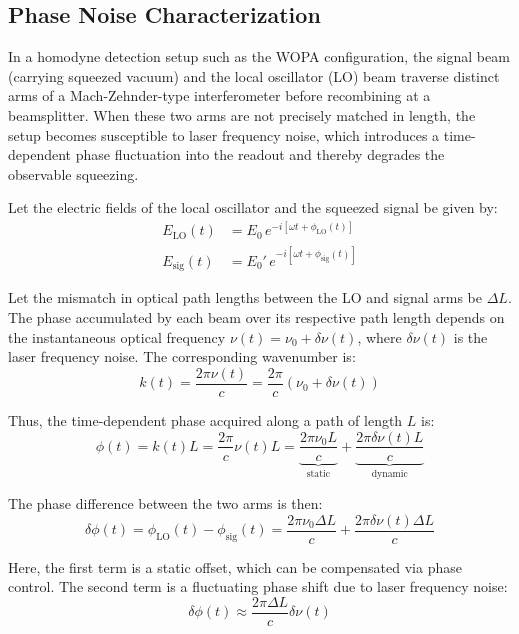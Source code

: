 \documentclass[colorlinks=true,pdfstartview=FitV,linkcolor=blue,
citecolor=red,urlcolor=magenta]{ligodoc}
\begin{document}
\subsection{Phase Noise Characterization}
In a homodyne detection setup such as the WOPA configuration, the signal beam (carrying squeezed vacuum) and the local oscillator (LO) beam traverse distinct arms of a Mach-Zehnder-type interferometer before recombining at a beamsplitter. When these two arms are not precisely matched in length, the setup becomes susceptible to laser frequency noise, which introduces a time-dependent phase fluctuation into the readout and thereby degrades the observable squeezing.

Let the electric fields of the local oscillator and the squeezed signal be given by:
\begin{align}
    E_{\text{LO}}(t) &= E_0 \, e^{-i[\omega t + \phi_{\text{LO}}(t)]} \\
    E_{\text{sig}}(t) &= E_0' \, e^{-i[\omega t + \phi_{\text{sig}}(t)]}
\end{align}

Let the mismatch in optical path lengths between the LO and signal arms be \( \Delta L \). The phase accumulated by each beam over its respective path length depends on the instantaneous optical frequency \( \nu(t) = \nu_0 + \delta \nu(t) \), where \( \delta \nu(t) \) is the laser frequency noise. The corresponding wavenumber is:
\begin{equation}
    k(t) = \frac{2\pi \nu(t)}{c} = \frac{2\pi}{c} (\nu_0 + \delta \nu(t))
\end{equation}

Thus, the time-dependent phase acquired along a path of length \( L \) is:
\begin{equation}
    \phi(t) = k(t) L = \frac{2\pi}{c} \nu(t) L = \underbrace{\frac{2\pi \nu_0 L}{c}}_{\text{static}} + \underbrace{\frac{2\pi \delta \nu(t) L}{c}}_{\text{dynamic}}
\end{equation}

The phase difference between the two arms is then:
\begin{equation}
    \delta \phi(t) = \phi_{\text{LO}}(t) - \phi_{\text{sig}}(t) = \frac{2\pi \nu_0 \Delta L}{c} + \frac{2\pi \delta \nu(t) \Delta L}{c}
\end{equation}

Here, the first term is a static offset, which can be compensated via phase control. The second term is a fluctuating phase shift due to laser frequency noise:
\begin{equation}
    \delta \phi(t) \approx \frac{2\pi \Delta L}{c} \delta \nu(t)
\end{equation}
\end{document}
